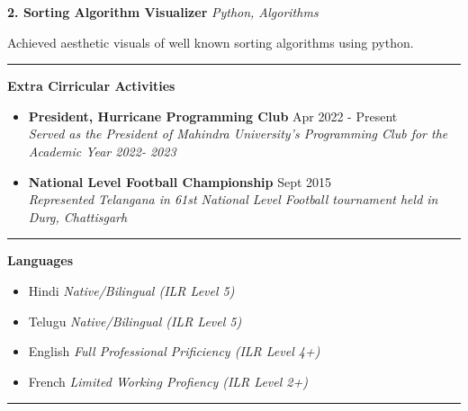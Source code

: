 \documentclass[a4paper, oneside, 12pt]{article}
\begin{document}
\begin{flushleft}
\textbf{2. Sorting Algorithm Visualizer} \textit{\hfill Python, Algorithms} \\
\vspace{2mm}
\begin{flushright}
Achieved aesthetic visuals of well known sorting algorithms using python. \\
\end{flushright}

\vspace{5mm}
\hrule
\vspace{5mm}

{\Large\textbf{Extra Cirricular Activities}} \\
\begin{itemize}
\item \textbf{President, Hurricane Programming Club} \hfill Apr 2022 - Present \\
\textit{Served as the President of Mahindra University's Programming Club for the Academic Year 2022- 2023}
\item \textbf{National Level Football Championship} \hfill Sept 2015 \\
\textit{Represented Telangana in 61st National Level Football tournament held in Durg, Chattisgarh}
\end{itemize}

\vspace{5mm}
\hrule
\vspace{5mm}

{\Large\textbf{Languages}} \\
\begin{itemize}
\item Hindi \textit{\hfill Native/Bilingual (ILR Level 5)} \\
\item Telugu \textit{\hfill Native/Bilingual (ILR Level 5)} \\
\item English \textit{\hfill Full Professional Prificiency (ILR Level 4+)} \\
\item French \textit{\hfill Limited Working Profiency (ILR Level 2+)} \\
\end{itemize}

\vspace{5mm}
\hrule
\vspace{5mm}

\end{flushleft}
\end{document}
